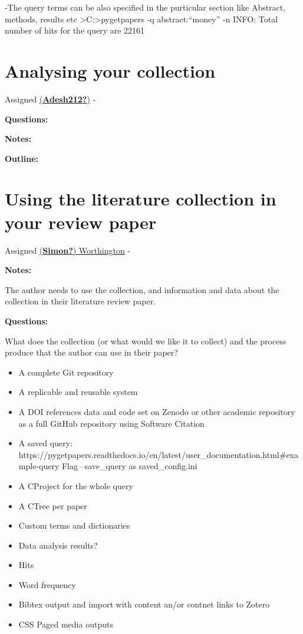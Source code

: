 \documentclass[
  letterpaper,
  DIV=11,
  numbers=noendperiod]{scrreprt}
\providecommand{\tightlist}{%
  \setlength{\itemsep}{0pt}\setlength{\parskip}{0pt}}\usepackage{longtable,booktabs,array}
\begin{document}
-The query terms can be also specified in the purticular section like
Abstract, methods, results etc
\textgreater{}C:\Users\lilia\textgreater pygetpapers -q
abstract:``money'' -n INFO: Total number of hits for the query are 22161

\section{Analysing your collection}\label{analysing-your-collection}

Assigned \href{https://github.com/Adesh212}{(\textbf{Adesh212?})} -

\textbf{Questions:}

\textbf{Notes:}

\textbf{Outline:}

\section{Using the literature collection in your review
paper}\label{using-the-literature-collection-in-your-review-paper}

Assigned \href{https://github.com/mrchristian}{(\textbf{Simon?})
Worthington} -

\textbf{Notes:}

The author needs to use the collection, and information and data about
the collection in their literature review paper.

\textbf{Questions:}

What does the collection (or what would we like it to collect) and the
process produce that the author can use in their paper?

\begin{itemize}
\tightlist
\item
  A complete Git repository
\item
  A replicable and reusable system
\item
  A DOI references data and code set on Zenodo or other academic
  repository as a full GitHub repository using Software Citation
\item
  A saved query:
  https://pygetpapers.readthedocs.io/en/latest/user\_documentation.html\#example-query
  Flag --save\_query as saved\_config.ini
\item
  A CProject for the whole query
\item
  A CTree per paper
\item
  Custom terms and dictionaries
\item
  Data analysis results?
\item
  Hits
\item
  Word frequency
\item
  Bibtex output and import with content an/or contnet links to Zotero
\item
  CSS Paged media outputs
\end{itemize}
\end{document}
